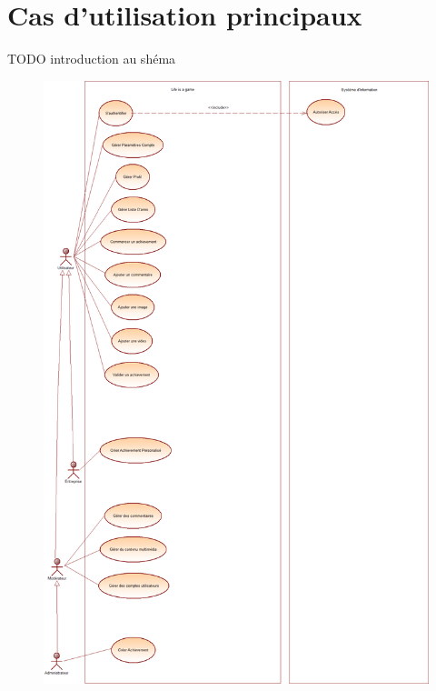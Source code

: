 \documentclass{life-fr}
\begin{document}
\section{Cas d'utilisation principaux}

TODO introduction au shéma

\newpage

\begin{figure}[H]
  \begin{center}
    \includegraphics[width=15cm]{img/use_case_principaux.png}
  \end{center}
\end{figure}
\end{document}
